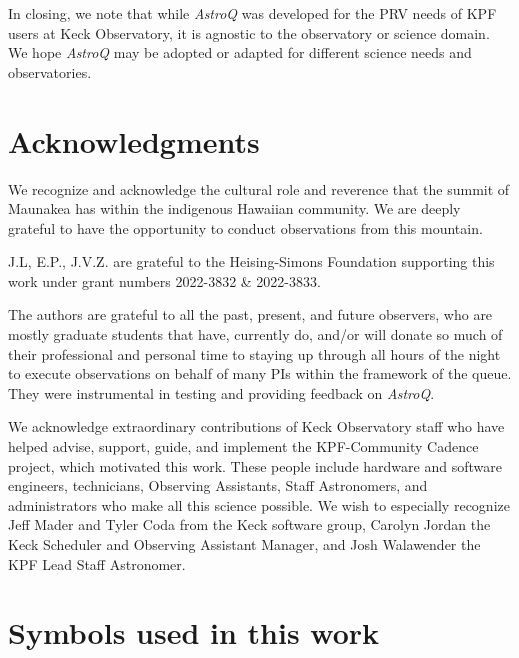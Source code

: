 \documentclass[twocolumn,linenumbers]{aastex63}
\newcommand{\AstroQ}{\textit{AstroQ}\xspace}
\begin{document}
In closing, we note that while \AstroQ was developed for the PRV needs of KPF users at Keck Observatory, it is agnostic to the observatory or science domain. We hope \AstroQ may be adopted or adapted for different science needs and observatories. 

\section{Acknowledgments}
\label{Acknowledgements}

We recognize and acknowledge the cultural role and reverence that the summit of Maunakea has within the indigenous Hawaiian community. We are deeply grateful to have the opportunity to conduct observations from this mountain. 

J.L, E.P., J.V.Z. are grateful to the Heising-Simons Foundation supporting this work under grant numbers 2022-3832 \& 2022-3833. 

The authors are grateful to all the past, present, and future observers, who are mostly graduate students that have, currently do, and/or will donate so much of their professional and personal time to staying up through all hours of the night to execute observations on behalf of many PIs within the framework of the queue. They were instrumental in testing and providing feedback on \AstroQ. 

We acknowledge extraordinary contributions of Keck Observatory staff who have helped advise, support, guide, and implement the KPF-Community Cadence project, which motivated this work. These people include hardware and software engineers, technicians, Observing Assistants, Staff Astronomers, and administrators who make all this science possible. We wish to especially recognize Jeff Mader and Tyler Coda from the Keck software group, Carolyn Jordan the Keck Scheduler and Observing Assistant Manager, and Josh Walawender the KPF Lead Staff Astronomer. 

\appendix
\section{Symbols used in this work}



\end{document}
